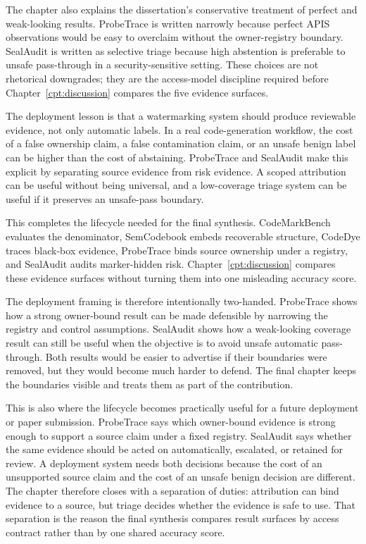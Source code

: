 The chapter also explains the dissertation's conservative treatment of perfect and weak-looking results. ProbeTrace is written narrowly because perfect APIS observations would be easy to overclaim without the owner-registry boundary. SealAudit is written as selective triage because high abstention is preferable to unsafe pass-through in a security-sensitive setting. These choices are not rhetorical downgrades; they are the access-model discipline required before Chapter~\ref{cpt:discussion} compares the five evidence surfaces.

The deployment lesson is that a watermarking system should produce reviewable evidence, not only automatic labels. In a real code-generation workflow, the cost of a false ownership claim, a false contamination claim, or an unsafe benign label can be higher than the cost of abstaining. ProbeTrace and SealAudit make this explicit by separating source evidence from risk evidence. A scoped attribution can be useful without being universal, and a low-coverage triage system can be useful if it preserves an unsafe-pass boundary.

This completes the lifecycle needed for the final synthesis. CodeMarkBench evaluates the denominator, SemCodebook embeds recoverable structure, CodeDye traces black-box evidence, ProbeTrace binds source ownership under a registry, and SealAudit audits marker-hidden risk. Chapter~\ref{cpt:discussion} compares these evidence surfaces without turning them into one misleading accuracy score.

The deployment framing is therefore intentionally two-handed. ProbeTrace shows how a strong owner-bound result can be made defensible by narrowing the registry and control assumptions. SealAudit shows how a weak-looking coverage result can still be useful when the objective is to avoid unsafe automatic pass-through. Both results would be easier to advertise if their boundaries were removed, but they would become much harder to defend. The final chapter keeps the boundaries visible and treats them as part of the contribution.

This is also where the lifecycle becomes practically useful for a future deployment or paper submission. ProbeTrace says which owner-bound evidence is strong enough to support a source claim under a fixed registry. SealAudit says whether the same evidence should be acted on automatically, escalated, or retained for review. A deployment system needs both decisions because the cost of an unsupported source claim and the cost of an unsafe benign decision are different. The chapter therefore closes with a separation of duties: attribution can bind evidence to a source, but triage decides whether the evidence is safe to use. That separation is the reason the final synthesis compares result surfaces by access contract rather than by one shared accuracy score.

